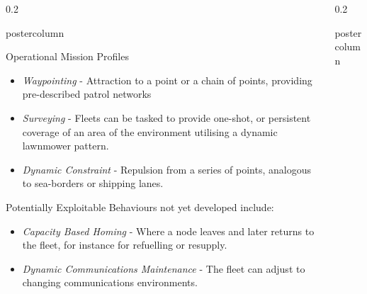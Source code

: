\documentclass[final,hyperref={pdfpagelabels=false}]{beamer}
\def\colwidth{0.2\linewidth}
\begin{document}
\begin{frame}[fragile]
\begin{columns}[T]
\begin{column}{\colwidth}
\begin{beamercolorbox}[center,wd=\textwidth]{postercolumn}
\begin{minipage}[T]{.98\textwidth}
{\begin{block}{Operational Mission Profiles}
            \begin{itemize}
              \item \emph{Waypointing} - Attraction to a point or a chain of points, providing pre-described patrol networks
              \item \emph{Surveying} - Fleets can be tasked to provide one-shot, or persistent coverage of an area of the environment utilising a dynamic lawnmower pattern.
              \item \emph{Dynamic Constraint} - Repulsion from a series of points, analogous to sea-borders or shipping lanes.
            \end{itemize}

            Potentially Exploitable Behaviours not yet developed include:
            \begin{itemize}
              \item \emph{Capacity Based Homing} - Where a node leaves and later returns to the fleet, for instance for refuelling or resupply.
              \item \emph{Dynamic Communications Maintenance} - The fleet can adjust to changing communications environments.
            \end{itemize}
          \end{block}


          }
        \end{minipage}
      \end{beamercolorbox}
    \end{column}

    \begin{column}{\colwidth}
      \begin{beamercolorbox}[center,wd=\textwidth]{postercolumn}
        \begin{minipage}[T]{.98\textwidth} %
          \parbox[t]{\textwidth}{ %

}
\end{minipage}
\end{beamercolorbox}
\end{column}
\end{columns}
\end{frame}
\end{document}
